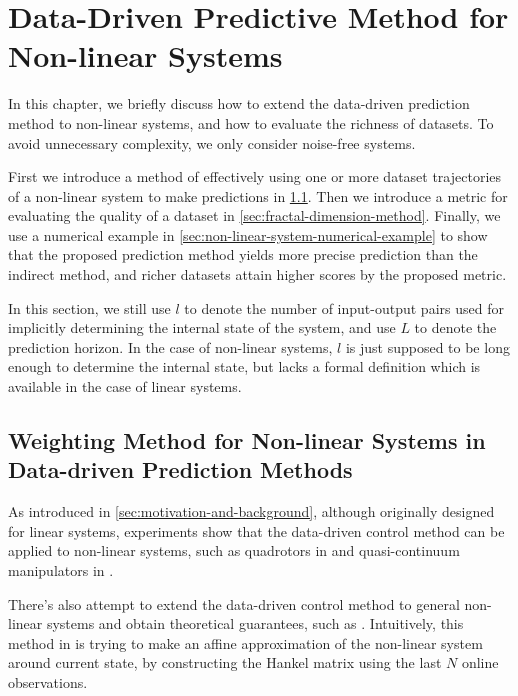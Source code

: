 \chapter{Data-Driven Predictive Method for Non-linear Systems}\label{chap:non-linear-system}

In this chapter, we briefly discuss how to extend the data-driven prediction method to non-linear systems, and how to evaluate the richness of datasets.
To avoid unnecessary complexity, we only consider noise-free systems.

First we introduce a method of effectively using one or more dataset trajectories of a non-linear system to make predictions in \cref{sec:weighting-method}.
Then we introduce a metric for evaluating the quality of a dataset in \cref{sec:fractal-dimension-method}.
Finally, we use a numerical example in \cref{sec:non-linear-system-numerical-example} to show that the proposed prediction method yields more precise prediction than the indirect method, and richer datasets attain higher scores by the proposed metric.

In this section, we still use $l$ to denote the number of input-output pairs used for implicitly determining the internal state of the system, and use $L$ to denote the prediction horizon.
In the case of non-linear systems, $l$ is just supposed to be long enough to determine the internal state, but lacks a formal definition which is available in the case of linear systems.


\section{Weighting Method for Non-linear Systems in Data-driven Prediction Methods}\label{sec:weighting-method}

As introduced in \cref{sec:motivation-and-background}, although originally designed for linear systems, experiments show that the data-driven control method can be applied to non-linear systems, such as quadrotors in \cite{elokdaDataQuad2021} and quasi-continuum manipulators in \cite{mullerDataDrivenQCR2022}.

There's also attempt to extend the data-driven control method to general non-linear systems and obtain theoretical guarantees, such as \cite{berberichLinearTrackingMPCData2022}.
Intuitively, this method in \cite{berberichLinearTrackingMPCData2022} is trying to make an affine approximation of the non-linear system around current state, by constructing the Hankel matrix using the last $N$ online observations.

